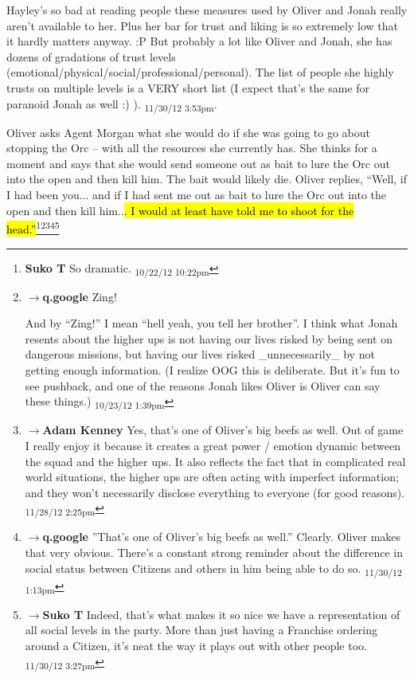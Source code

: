{Hayley's so bad at reading people these measures used by Oliver and Jonah really aren't available to her.  Plus her bar for trust and liking is so extremely low that it hardly matters anyway. :P  But probably a lot like Oliver and Jonah, she has dozens of gradations of trust levels (emotional/physical/social/professional/personal).  The list of people she highly trusts on multiple levels is a VERY short list (I expect that's the same for paranoid Jonah as well :) ). \textsubscript{11/30/12 3:53pm}}.



Oliver asks Agent Morgan what she would do if she was going to go about stopping the Orc -- with all the resources she currently has.  She thinks for a moment and says that she would send someone out as bait to lure the Orc out into the open and then kill him.  The bait would likely die.   Oliver replies, ``Well, if I had been you... and if I had sent me out as bait to lure the Orc out into the open and then kill him..\hl{. I would at least have told me to shoot for the head.''}\footnote{\textbf{Suko T }So dramatic. \textsubscript{10/22/12 10:22pm}}\footnote{$\rightarrow$\textbf{q.google }Zing!

And by ``Zing!'' I mean ``hell yeah, you tell her brother''.  I think what Jonah resents about the higher ups is not having our lives risked by being sent on dangerous missions, but having our lives risked \_unnecessarily\_ by not getting enough information.  (I realize OOG this is deliberate.  But it's fun to see pushback, and one of the reasons Jonah likes Oliver is Oliver can say these things.) \textsubscript{10/23/12 1:39pm}}\footnote{$\rightarrow$\textbf{Adam Kenney }Yes, that's one of Oliver's big beefs as well.  Out of game I really enjoy it because it creates a great power / emotion dynamic between the squad and the higher ups.  It also reflects the fact that in complicated real world situations, the higher ups are often acting with imperfect information; and they won't necessarily disclose everything to everyone (for good reasons). \textsubscript{11/28/12 2:25pm}}\footnote{$\rightarrow$\textbf{q.google }''That's one of Oliver's big beefs as well.''
Clearly.  Oliver makes that very obvious.  There's a constant strong reminder about the difference in social status between Citizens and others in him being able to do so. \textsubscript{11/30/12 1:13pm}}\footnote{$\rightarrow$\textbf{Suko T }Indeed, that's what makes it so nice we have a representation of all social levels in the party.  More than just having a Franchise ordering around a Citizen, it's neat the way it plays out with other people too. \textsubscript{11/30/12 3:27pm}}



